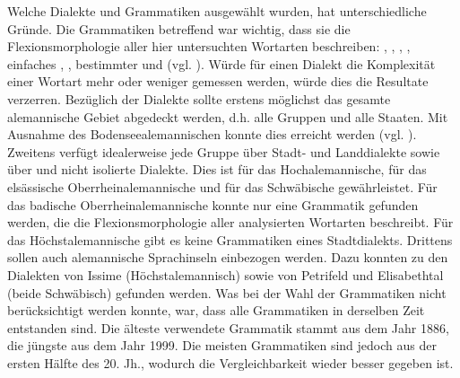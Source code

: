 Welche Dialekte und Grammatiken ausgewählt wurden, hat unterschiedliche Gründe. Die Grammatiken betreffend war wichtig, dass sie die Flexionsmorphologie aller hier untersuchten Wortarten beschreiben: , , , , einfaches , , bestimmter und  (vgl. ). Würde für einen Dialekt die Komplexität einer Wortart mehr oder weniger gemessen werden, würde dies die Resultate verzerren. Bezüglich der Dialekte sollte erstens möglichst das gesamte alemannische Gebiet abgedeckt werden, d.h. alle Gruppen und alle Staaten. Mit Ausnahme des Bodenseealemannischen konnte dies erreicht werden (vgl. ). Zweitens verfügt idealerweise jede Gruppe über Stadt- und Landdialekte sowie über  und nicht isolierte Dialekte. Dies ist für das Hochalemannische, für das elsässische Oberrheinalemannische und für das Schwäbische gewährleistet. Für das badische Oberrheinalemannische konnte nur eine Grammatik gefunden werden, die die Flexionsmorphologie aller analysierten Wortarten beschreibt. Für das Höchstalemannische gibt es keine Grammatiken eines Stadtdialekts. Drittens sollen auch alemannische Sprachinseln einbezogen werden. Dazu konnten  zu den Dialekten von Issime (Höchstalemannisch) sowie von Petrifeld und Elisabethtal (beide Schwäbisch) gefunden werden. Was bei der Wahl der Grammatiken nicht berücksichtigt werden konnte, war, dass alle Grammatiken in derselben Zeit entstanden sind. Die älteste verwendete Grammatik stammt aus dem Jahr 1886, die jüngste aus dem Jahr 1999. Die meisten Grammatiken sind jedoch aus der ersten Hälfte des 20. Jh., wodurch die Vergleichbarkeit wieder besser gegeben ist.

